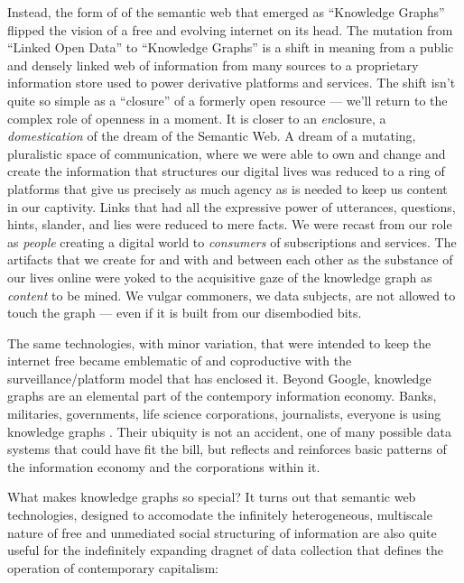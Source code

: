 Instead, the form of of the semantic web that emerged as ``Knowledge
Graphs'' flipped the vision of a free and evolving internet on its head.
The mutation from ``Linked Open Data'' \cite{berners-leeLinkedData2006}  to ``Knowledge Graphs'' is a shift in
meaning from a public and densely linked web of information from many
sources to a proprietary information store used to power derivative
platforms and services. The shift isn't quite so simple as a ``closure''
of a formerly open resource --- we'll return to the complex role of
openness in a moment. It is closer to an \emph{en}closure, a
\emph{domestication} of the dream of the Semantic Web. A dream of a
mutating, pluralistic space of communication, where we were able to own
and change and create the information that structures our digital lives
was reduced to a ring of platforms that give us precisely as much agency
as is needed to keep us content in our captivity. Links that had all the
expressive power of utterances, questions, hints, slander, and lies were
reduced to mere facts. We were recast from our role as \emph{people}
creating a digital world to \emph{consumers} of subscriptions and
services. The artifacts that we create for and with and between each
other as the substance of our lives online were yoked to the acquisitive
gaze of the knowledge graph as \emph{content} to be mined. We vulgar
commoners, we data subjects, are not allowed to touch the graph --- even
if it is built from our disembodied bits.

The same technologies, with minor variation, that were intended to keep
the internet free became emblematic of and coproductive with the
surveillance/platform model that has enclosed it. Beyond Google,
knowledge graphs are an elemental part of the contempory information
economy. Banks, militaries, governments, life science corporations,
journalists, everyone is using knowledge graphs \cite{neo4jNeo4jCustomers, enterpriseknowledgegraphfoundationKnowledgeGraphIndustry2022} . Their
ubiquity is not an accident, one of many possible data systems that
could have fit the bill, but reflects and reinforces basic patterns of
the information economy and the corporations within it.

What makes knowledge graphs so special? It turns out that semantic web
technologies, designed to accomodate the infinitely heterogeneous,
multiscale nature of free and unmediated social structuring of
information are also quite useful for the indefinitely expanding dragnet
of data collection that defines the operation of contemporary
capitalism:

